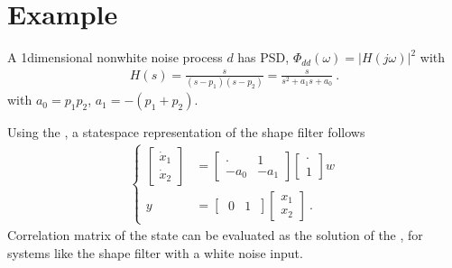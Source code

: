 \documentclass[letterpaper,10pt,english]{jupyterBook}
\begin{document}
\section{Example}
\label{\detokenize{ch/system-theory/shape-filter:example}}\label{\detokenize{ch/system-theory/shape-filter:id1}}
\sphinxAtStartPar
A 1\sphinxhyphen{}dimensional non\sphinxhyphen{}white noise process \(d\) has PSD, \(\Phi_{dd}(\omega) = | H(j \omega) |^2\) with
\begin{equation*}
\begin{split}H(s) = \frac{s}{(s-p_1)(s-p_2)} = \frac{s}{s^2 + a_1 s + a_0} \ .\end{split}
\end{equation*}
\sphinxAtStartPar
with \(a_0 = p_1 p_2\), \(a_1 = - ( p_1 + p_2 )\).

\sphinxAtStartPar
Using the {\hyperref[\detokenize{ch/system-theory/realizations:system-theory-state-space-realizations-ccf}]{}}, a state\sphinxhyphen{}space representation of the shape filter follows
\begin{equation*}
\begin{split}\left\{\begin{aligned}
 \begin{bmatrix} \dot{x}_1 \\ \dot{x}_2 \end{bmatrix} & = \begin{bmatrix} \cdot & 1 \\ - a_0 & - a_1 \end{bmatrix} \begin{bmatrix} \cdot \\ 1 \end{bmatrix} w \\
 y & = \begin{bmatrix} \ 0 & 1 \ \end{bmatrix} \begin{bmatrix} x_1 \\ x_2 \end{bmatrix} \ .
\end{aligned}\right.\end{split}
\end{equation*}
\sphinxAtStartPar
{} Correlation matrix of the state can be evaluated as the solution of the {\hyperref[\detokenize{ch/ode/ode-linear-systems:ode-linear-miscellanea-stochastic-response-correlation-matrix-lyapunov}]{}}, for systems \sphinxhyphen{} like the shape filter \sphinxhyphen{} with a white noise input.
\end{document}
